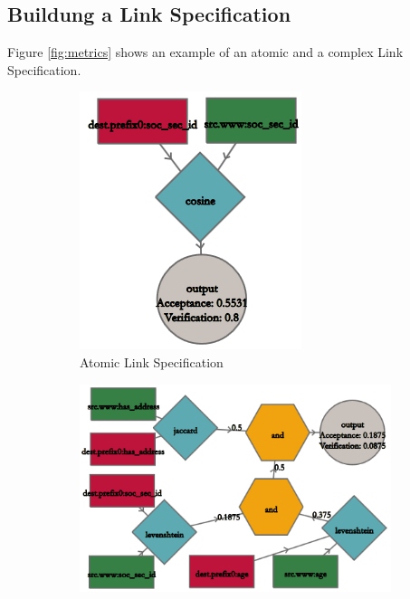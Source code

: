 \documentclass[oneside,a4paper,12pt]{memoir}
\begin{document}
\subsection{Buildung a Link Specification}
Figure \ref{fig:metrics} shows an example of an atomic and a complex Link Specification.
\begin{figure}
        \centering
        \begin{subfigure}[b]{0.30\textwidth}
                \centering
								\includegraphics[width=\textwidth]{images/atomic1.png}
                \caption{Atomic Link Specification}
                \label{fig:atomic}
        \end{subfigure}
				\hspace{0.3cm}
				\begin{subfigure}[b]{0.6\textwidth}
                \centering
								\includegraphics[width=\textwidth]{images/complex1.png}

\end{subfigure}
\end{figure}
\end{document}
